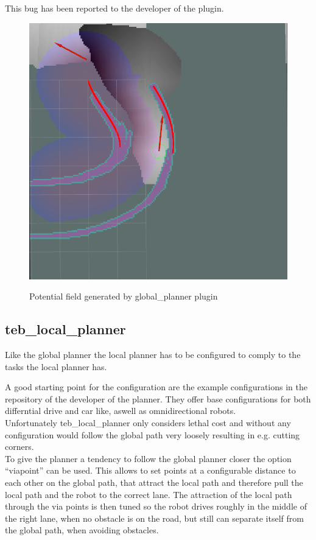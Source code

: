  This bug has been reported to the developer of the plugin.
 
 \begin{figure}[H]
 	\centering
 	\includegraphics[width=.7\textwidth]{Pictures/out of bounds}	
 	\label{potentialfield}
 	\caption{Potential field generated by global\_planner plugin}
 \end{figure}


\subsection{teb\_local\_planner}

Like the global planner the local planner has to be configured to comply to the tasks the local planner has.

A good starting point for the configuration are the example configurations in the repository of the developer of the planner\cite{tebtutorials}. They offer base configurations for both differntial drive and car like, aswell as omnidirectional robots.\\

Unfortunately teb\_local\_planner only considers lethal cost and without any configuration would follow the global path very loosely resulting in e.g. cutting corners.\\ 

To give the planner a tendency to follow the global planner closer the option ``viapoint'' can be used. This allows to set points at a configurable distance to each other on the global path, that attract the local path and therefore pull the local path and the robot to the correct lane. The attraction of the local path through the via points is then tuned so the robot drives roughly in the middle of the right lane, when no obstacle is on the road, but still can separate itself from the global path, when avoiding obstacles.\\

